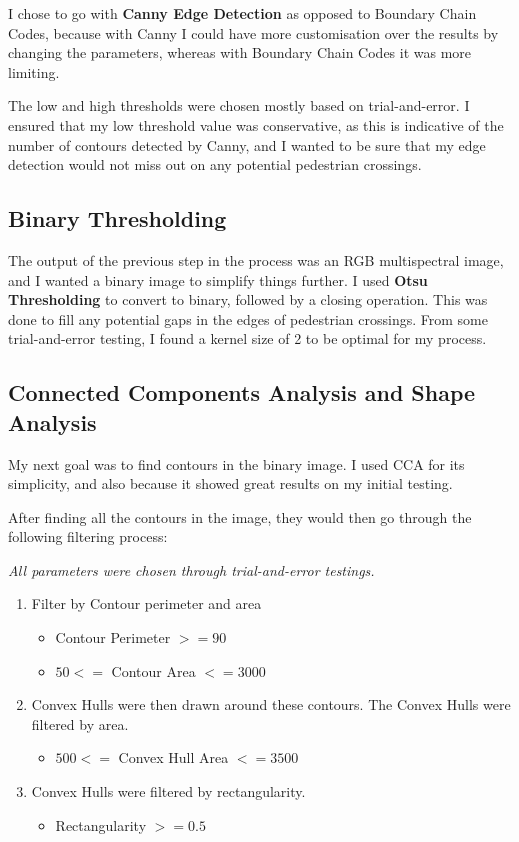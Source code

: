 \documentclass{article}  %
\begin{document}
	I chose to go with \textbf{Canny Edge Detection} as opposed to Boundary Chain Codes, because with Canny I could have more customisation over the results by changing the parameters, whereas with Boundary Chain Codes it was more limiting.
	
	The low and high thresholds were chosen mostly based on trial-and-error. I ensured that my low threshold value was conservative, as this is indicative of the number of contours detected by Canny, and I wanted to be sure that my edge detection would not miss out on any potential pedestrian crossings.
	
	\subsection{Binary Thresholding}
	
	The output of the previous step in the process was an RGB multispectral image, and I wanted a binary image to simplify things further. I used \textbf{Otsu Thresholding} to convert to binary, followed by a closing operation. This was done to fill any potential gaps in the edges of pedestrian crossings. From some trial-and-error testing, I found a kernel size of 2 to be optimal for my process.
	
	\subsection{Connected Components Analysis and Shape Analysis}
	
	My next goal was to find contours in the binary image. I used CCA for its simplicity, and also because it showed great results on my initial testing.
	
	After finding all the contours in the image, they would then go through the following filtering process:
	
	\emph{All parameters were chosen through trial-and-error testings.}
	
	\begin{enumerate}
		\item Filter by Contour perimeter and area
		\begin{itemize}
			\item Contour Perimeter $>= 90$
			\item $50 <= $ Contour Area $ <= 3000$
		\end{itemize}
		\item Convex Hulls were then drawn around these contours. The Convex Hulls were filtered by area.
		\begin{itemize}
			\item $500 <= $ Convex Hull Area $ <= 3500$
		\end{itemize}
		\item Convex Hulls were filtered by rectangularity.
		\begin{itemize}
			\item Rectangularity $>= 0.5$
		\end{itemize}
	\end{enumerate}
	
\end{document}

